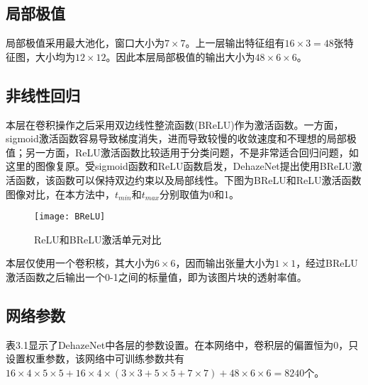 \documentclass[a4paper, 12pt, oneside]{report}
\begin{document}
{\subsection{局部极值\quad}
局部极值采用最大池化，窗口大小为$7\times 7$。上一层输出特征组有$16 \times 3 = 48$张特征图，大小均为$12 \times 12$。因此本层局部极值的输出大小为$48 \times 6 \times 6$。

\subsection{非线性回归\quad}
本层在卷积操作之后采用双边线性整流函数(BReLU)作为激活函数。一方面，sigmoid激活函数容易导致梯度消失，进而导致较慢的收敛速度和不理想的局部极值；另一方面，ReLU激活函数比较适用于分类问题，不是非常适合回归问题，如这里的图像复原。受sigmoid函数和ReLU函数启发，DehazeNet提出使用BReLU激活函数，该函数可以保持双边约束以及局部线性。下图为BReLU和ReLU激活函数图像对比，在本方法中，$t_{min}$和$t_{max}$分别取值为0和1。

\begin{figure}[H]
\centering
\texttt{[image: BReLU]}
\caption{ReLU和BReLU激活单元对比}
\end{figure}
本层仅使用一个卷积核，其大小为$6 \times 6$，因而输出张量大小为$1 \times 1$，经过BReLU激活函数之后输出一个0-1之间的标量值，即为该图片块的透射率值。

\subsection{网络参数\quad}
表3.1显示了DehazeNet中各层的参数设置。在本网络中，卷积层的偏置恒为0，只设置权重参数，该网络中可训练参数共有$16 \times 4 \times 5 \times 5 + 16 \times 4 \times (3 \times 3 + 5 \times 5 + 7 \times 7) + 48 \times 6 \times 6 = 8240$个。

}
\end{document}
